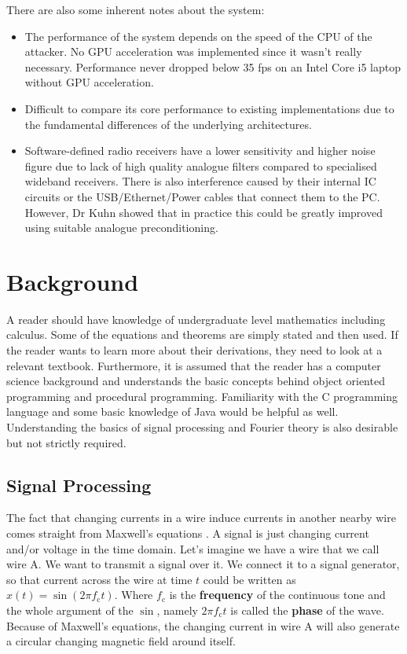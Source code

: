 \documentclass[a4paper,12pt,twoside,openright]{report}
\begin{document}
There are also some inherent notes about the system:
\begin{itemize}

  \item The performance of the system depends on the speed of the CPU of the attacker. No GPU acceleration was implemented since it wasn't really necessary. Performance never dropped below 35 fps on an Intel Core i5 laptop without GPU acceleration.
  \item Difficult to compare its core performance to existing implementations due to the fundamental differences of the underlying architectures.
  \item Software-defined radio receivers have a lower sensitivity and higher noise figure due to lack of high quality analogue filters compared to specialised wideband receivers. There is also interference caused by their internal IC circuits or the USB/Ethernet/Power cables that connect them to the PC. However, Dr Kuhn showed that in practice this could be greatly improved using suitable analogue preconditioning.
  
\end{itemize}

\chapter{Background}

A reader should have knowledge of undergraduate level mathematics including calculus. Some of the equations and theorems are simply stated and then used. If the reader wants to learn more about their derivations, they need to look at a relevant textbook. Furthermore, it is assumed that the reader has a computer science background and understands the basic concepts behind object oriented programming and procedural programming. Familiarity with the C programming language and some basic knowledge of Java would be helpful as well. Understanding the basics of signal processing and Fourier theory is also desirable but not strictly required.

\section{Signal Processing} 

The fact that changing currents in a wire induce currents in another nearby wire comes straight from Maxwell's equations \cite{maxwell1881treatise}. A signal is just changing current and/or voltage in the time domain. Let's imagine we have a wire that we call wire A. We want to transmit a signal over it. We connect it to a signal generator, so that current across the wire at time $t$ could be written as $x(t) = \sin(2\pi f_\text{c} t)$. Where $f_\text{c}$ is the \textbf{frequency} of the continuous tone and the whole argument of the $\sin$, namely $2\pi f_\text{c} t$ is called the \textbf{phase} of the wave. Because of Maxwell's equations, the changing current in wire A will also generate a circular changing magnetic field around itself.
\end{document}
